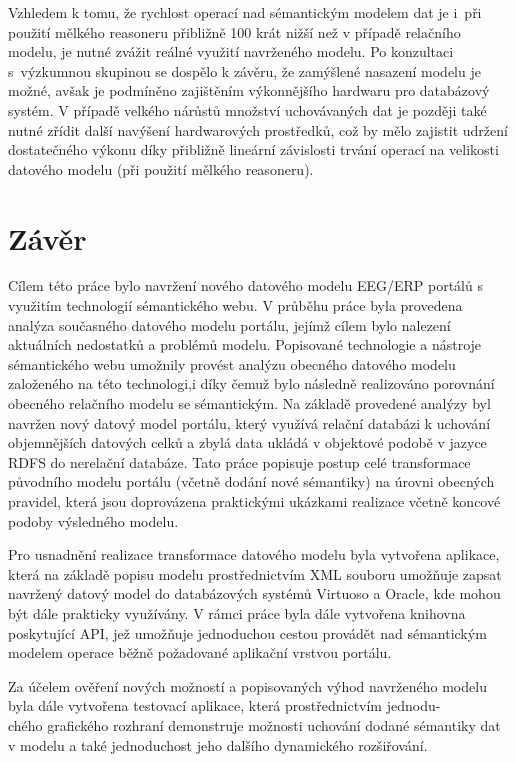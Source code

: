 \documentclass{projekt}
\begin{document}
Vzhledem k tomu, že rychlost operací nad sémantickým modelem dat je i~při použití mělkého reasoneru přibližně 100 krát nižší než v případě relačního modelu, je nutné zvážit reálné využití navrženého modelu. Po konzultaci s~výzkumnou skupinou se dospělo k závěru, že zamýšlené nasazení modelu je možné, avšak je podmíněno zajištěním výkonnějšího hardwaru pro databázový systém. V případě velkého nárůstů množství uchovávaných dat je později také nutné zřídit další navýšení hardwarových prostředků, což by mělo zajistit udržení dostatečného výkonu díky přibližně lineární závislosti trvání operací na velikosti datového modelu (při použití mělkého reasoneru).


\chapter{Závěr}
\hspace{0.65cm}Cílem této práce bylo navržení nového datového modelu EEG/ERP portálů s využitím technologií sémantického webu. V průběhu práce byla provedena analýza současného datového modelu portálu, jejímž cílem bylo nalezení aktuálních nedostatků a problémů modelu. Popisované technologie a nástroje sémantického webu umožnily provést analýzu obecného datového modelu založeného na této technologi,i díky čemuž bylo následně realizováno porovnání obecného relačního modelu se sémantickým. Na základě provedené analýzy byl navržen nový datový model portálu, který využívá relační databázi k uchování objemnějších datových celků a zbylá data ukládá v objektové podobě v jazyce RDFS do nerelační databáze. Tato práce popisuje postup celé transformace původního modelu portálu (včetně dodání nové sémantiky) na úrovni obecných pravidel, která jsou doprovázena praktickými ukázkami realizace včetně koncové podoby výsledného modelu.

Pro usnadnění realizace transformace datového modelu byla vytvořena aplikace, která na základě popisu modelu prostřednictvím XML souboru umožňuje zapsat navržený datový model do databázových systémů Virtuoso a Oracle, kde mohou být dále prakticky využívány. 
V rámci práce byla dále vytvořena knihovna poskytující API, jež umožňuje jednoduchou cestou provádět nad sémantickým modelem operace běžně požadované aplikační vrstvou portálu.


Za účelem ověření nových možností a popisovaných výhod navrženého modelu byla dále vytvořena testovací aplikace, která prostřednictvím jednodu-\\chého grafického rozhraní demonstruje možnosti uchování dodané sémantiky dat v modelu a také jednoduchost jeho dalšího dynamického rozšiřování.
\end{document}
